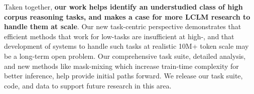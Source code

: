 

 Taken together, \textbf{our work helps identify an understudied class of \boldmath high \cname corpus reasoning tasks, and makes a case for more LCLM research to handle them at scale}. Our new task-centric perspective demonstrates that efficient methods that work for low-\cname tasks are insufficient at high-\cname, and that development of systems to handle such tasks at realistic 10M+ token scale may be a long-term open problem. Our comprehensive task suite, detailed analysis, and new methods like mask-mixing which increase train-time complexity for better inference, help provide initial paths forward. We release our task suite, code, and data to support future research in this area. 

